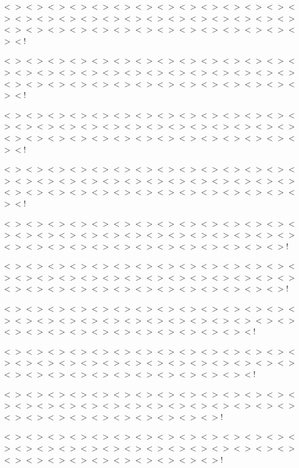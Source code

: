 $<$$>$$<$$>$$<$$>$$<$$>$$<$$>$$<$$>$$<$$>$$<$$>$$<$$>$$<$$>$$<$$>$$<$$>$$<$$>$$<$$>$$<$$>$$<$$>$$<$$>$$<$$>$$<$$>$$<$$>$$<$$>$$<$$>$$<$$>$$<$$>$$<$$>$$<$$>$$<$$>$$<$$>$$<$$>$$<$$>$$<$$>$$<$$>$$<$$>$$<$$>$$<$$>$$<$$>$$<$$>$$<$$>$$<$$>$$<$$>$$<$$>$$<$!

$<$$>$$<$$>$$<$$>$$<$$>$$<$$>$$<$$>$$<$$>$$<$$>$$<$$>$$<$$>$$<$$>$$<$$>$$<$$>$$<$$>$$<$$>$$<$$>$$<$$>$$<$$>$$<$$>$$<$$>$$<$$>$$<$$>$$<$$>$$<$$>$$<$$>$$<$$>$$<$$>$$<$$>$$<$$>$$<$$>$$<$$>$$<$$>$$<$$>$$<$$>$$<$$>$$<$$>$$<$$>$$<$$>$$<$$>$$<$$>$$<$$>$$<$!

$<$$>$$<$$>$$<$$>$$<$$>$$<$$>$$<$$>$$<$$>$$<$$>$$<$$>$$<$$>$$<$$>$$<$$>$$<$$>$$<$$>$$<$$>$$<$$>$$<$$>$$<$$>$$<$$>$$<$$>$$<$$>$$<$$>$$<$$>$$<$$>$$<$$>$$<$$>$$<$$>$$<$$>$$<$$>$$<$$>$$<$$>$$<$$>$$<$$>$$<$$>$$<$$>$$<$$>$$<$$>$$<$$>$$<$$>$$<$$>$$<$$>$$<$!

$<$$>$$<$$>$$<$$>$$<$$>$$<$$>$$<$$>$$<$$>$$<$$>$$<$$>$$<$$>$$<$$>$$<$$>$$<$$>$$<$$>$$<$$>$$<$$>$$<$$>$$<$$>$$<$$>$$<$$>$$<$$>$$<$$>$$<$$>$$<$$>$$<$$>$$<$$>$$<$$>$$<$$>$$<$$>$$<$$>$$<$$>$$<$$>$$<$$>$$<$$>$$<$$>$$<$$>$$<$$>$$<$$>$$<$$>$$<$$>$$<$$>$$<$!

$<$$>$$<$$>$$<$$>$$<$$>$$<$$>$$<$$>$$<$$>$$<$$>$$<$$>$$<$$>$$<$$>$$<$$>$$<$$>$$<$$>$$<$$>$$<$$>$$<$$>$$<$$>$$<$$>$$<$$>$$<$$>$$<$$>$$<$$>$$<$$>$$<$$>$$<$$>$$<$$>$$<$$>$$<$$>$$<$$>$$<$$>$$<$$>$$<$$>$$<$$>$$<$$>$$<$$>$$<$$>$$<$$>$$<$$>$$<$$>$!

$<$$>$$<$$>$$<$$>$$<$$>$$<$$>$$<$$>$$<$$>$$<$$>$$<$$>$$<$$>$$<$$>$$<$$>$$<$$>$$<$$>$$<$$>$$<$$>$$<$$>$$<$$>$$<$$>$$<$$>$$<$$>$$<$$>$$<$$>$$<$$>$$<$$>$$<$$>$$<$$>$$<$$>$$<$$>$$<$$>$$<$$>$$<$$>$$<$$>$$<$$>$$<$$>$$<$$>$$<$$>$$<$$>$$<$$>$$<$$>$!

$<$$>$$<$$>$$<$$>$$<$$>$$<$$>$$<$$>$$<$$>$$<$$>$$<$$>$$<$$>$$<$$>$$<$$>$$<$$>$$<$$>$$<$$>$$<$$>$$<$$>$$<$$>$$<$$>$$<$$>$$<$$>$$<$$>$$<$$>$$<$$>$$<$$>$$<$$>$$<$$>$$<$$>$$<$$>$$<$$>$$<$$>$$<$$>$$<$$>$$<$$>$$<$$>$$<$$>$$<$$>$$<$$>$$<$!

$<$$>$$<$$>$$<$$>$$<$$>$$<$$>$$<$$>$$<$$>$$<$$>$$<$$>$$<$$>$$<$$>$$<$$>$$<$$>$$<$$>$$<$$>$$<$$>$$<$$>$$<$$>$$<$$>$$<$$>$$<$$>$$<$$>$$<$$>$$<$$>$$<$$>$$<$$>$$<$$>$$<$$>$$<$$>$$<$$>$$<$$>$$<$$>$$<$$>$$<$$>$$<$$>$$<$$>$$<$$>$$<$$>$$<$!

$<$$>$$<$$>$$<$$>$$<$$>$$<$$>$$<$$>$$<$$>$$<$$>$$<$$>$$<$$>$$<$$>$$<$$>$$<$$>$$<$$>$$<$$>$$<$$>$$<$$>$$<$$>$$<$$>$$<$$>$$<$$>$$<$$>$$<$$>$$<$$>$$<$$>$$<$$>$$<$$>$$<$$>$$<$$>$$<$$>$$<$$>$$<$$>$$<$$>$$<$$>$$<$$>$$<$$>$$<$$>$!

$<$$>$$<$$>$$<$$>$$<$$>$$<$$>$$<$$>$$<$$>$$<$$>$$<$$>$$<$$>$$<$$>$$<$$>$$<$$>$$<$$>$$<$$>$$<$$>$$<$$>$$<$$>$$<$$>$$<$$>$$<$$>$$<$$>$$<$$>$$<$$>$$<$$>$$<$$>$$<$$>$$<$$>$$<$$>$$<$$>$$<$$>$$<$$>$$<$$>$$<$$>$$<$$>$$<$$>$$<$$>$!

